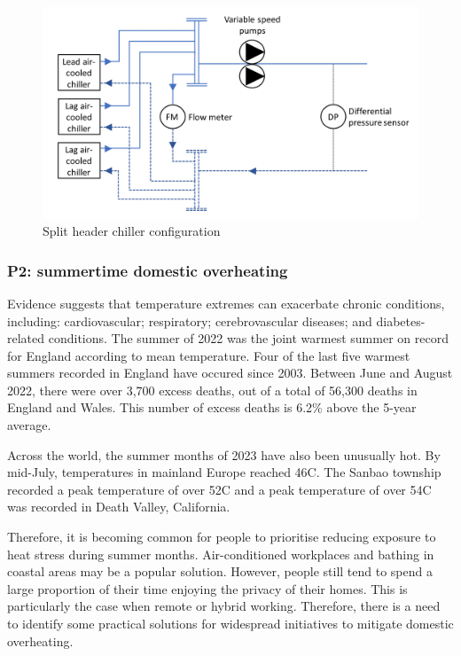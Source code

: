 \documentclass[11pt, oneside]{book}   	%
\begin{document}
\pagebreak

\FloatBarrier
\begin{figure}
\begin{center}
\includegraphics[width=1\textwidth]{splitHeader.PNG}
\caption{Split header chiller configuration}
\label{Split Header figure}
\end{center}
\end{figure}
\FloatBarrier

\pagebreak

\subsubsection{P2: summertime domestic overheating}
Evidence suggests that temperature extremes can exacerbate chronic conditions, including: cardiovascular; respiratory; cerebrovascular diseases; and diabetes-related conditions.
The summer of 2022 was the joint warmest summer on record for England according to mean temperature.
Four of the last five warmest summers recorded in England have occured since 2003.
Between June and August 2022, there were over 3,700 excess deaths, out of a total of 56,300 deaths in England and Wales.
This number of excess deaths is 6.2\% above the 5-year average.\

Across the world, the summer months of 2023 have also been unusually hot.
By mid-July, temperatures in mainland Europe reached 46\textdegree C.
The Sanbao township recorded a peak temperature of over 52\textdegree C and a peak temperature of over 54\textdegree C was recorded in Death Valley, California.\

Therefore, it is becoming common for people to prioritise reducing exposure to heat stress during summer months.
Air-conditioned workplaces and bathing in coastal areas may be a popular solution.
However, people still tend to spend a large proportion of their time enjoying the privacy of their homes.
This is particularly the case when remote or hybrid working.
Therefore, there is a need to identify some practical solutions for widespread initiatives to mitigate domestic overheating.\
\end{document}
